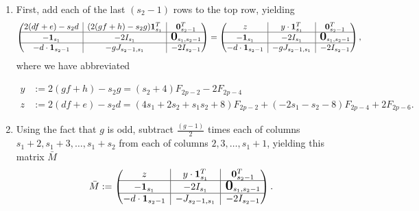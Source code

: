 \documentclass[10pt,reqno]{amsart}
\newcommand{\bigzero}{\mbox{\normalfont\Large\bfseries 0}}
\newcommand{\rvline}{\hspace*{-\arraycolsep}\vline\hspace*{-\arraycolsep}}
\def\onesvector{\mathbf{1}}
\def\zerovector{\mathbf{0}}
\begin{document}
\begin{enumerate}
\item First, add each of the last $(s_2-1)$ rows to the top row, yielding
$$
\begin{pmatrix}
2(df+e)-s_2d & \rvline & (2(gf+h)-s_2g )\onesvector^T_{s_1} & \rvline & \zerovector^T_{s_2-1} \\
\hline
-\onesvector_{s_1} & \rvline & -2I_{s_1} & \rvline & \bigzero_{s_1,s_2-1} \\
\hline
-d \cdot \onesvector_{s_2-1} & \rvline & -g J_{s_2-1,s_1} & \rvline & -2 I_{s_2-1} 
\end{pmatrix}
=
\begin{pmatrix}
z & \rvline & y \cdot \onesvector^T_{s_1} & \rvline & \zerovector^T_{s_2-1} \\
\hline
-\onesvector_{s_1} & \rvline & -2I_{s_1} & \rvline & \bigzero_{s_1,s_2-1} \\
\hline
-d \cdot \onesvector_{s_2-1} & \rvline & -g J_{s_2-1,s_1} & \rvline & -2 I_{s_2-1} 
\end{pmatrix},
$$
where we have abbreviated

\begin{align}
\label{definition-for-y}
y&:=2(gf+h)-s_2g
= (s_2 + 4)F_{2p-2} - 2F_{2p-4}\\
\label{definition-for-z}
z&:=2(df+e)-s_2d
=(4s_1 + 2s_2 + s_1s_2+ 8)F_{2p-2}+(-2s_1 - s_2 - 8)F_{2p-4}+ 2F_{2p-6}.
\end{align}

\item Using the fact that $g$ is odd, subtract $\frac{(g-1)}{2}$ times each of columns $s_1+2,s_1+3,\ldots,s_1+s_2$ from 
each of columns $2,3,\ldots, s_1+1$, yielding this matrix $\bar{M}$
\begin{equation}
\label{eq:promising-three-block-matrix}
\bar{M}:=\begin{pmatrix}
z & \rvline & y \cdot\onesvector^T_{s_1} & \rvline & \zerovector^T_{s_2-1} \\
\hline
-\onesvector_{s_1} & \rvline & -2I_{s_1} & \rvline & \bigzero_{s_1,s_2-1} \\
\hline
-d \cdot \onesvector_{s_2-1} & \rvline & - J_{s_2-1,s_1} & \rvline & -2 I_{s_2-1} 
\end{pmatrix}.
\end{equation}



\end{enumerate}
\end{document}
